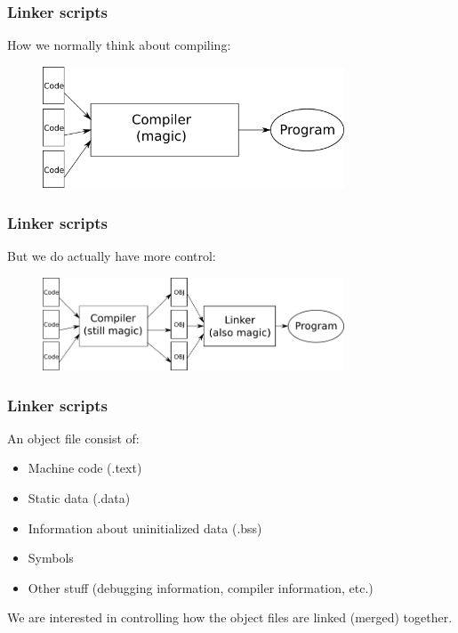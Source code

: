 \begin{frame}

\frametitle{Linker scripts}

\vspace{\fill}

How we normally think about compiling:
\begin{figure}
    \center
    \includegraphics[width=0.8\textwidth]{figures/compiling_simple.png}
\end{figure}

\vspace{\fill}

\end{frame}


\begin{frame}

\frametitle{Linker scripts}

\vspace{\fill}

But we do actually have more control:
\begin{figure}
    \center
    \includegraphics[width=0.8\textwidth]{figures/compiling.png}
\end{figure}

\vspace{\fill}

\end{frame}

\begin{frame}
\frametitle{Linker scripts}

\vspace{\fill}
An object file consist of:
\begin{itemize}
    \item Machine code (.text)
    \item Static data (.data)
    \item Information about uninitialized data (.bss)
    \item Symbols
    \item Other stuff (debugging information, compiler information, etc.)
\end{itemize}

\vspace{\fill}
We are interested in controlling how the object files are linked (merged) together.

\vspace{\fill}
\end{frame}

